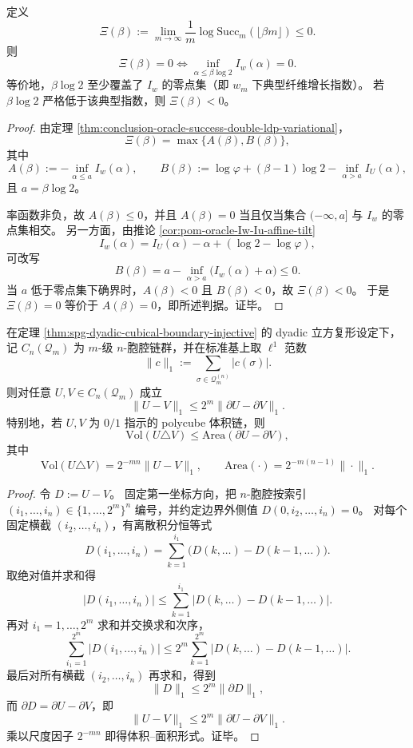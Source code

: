 \begin{corollary}[可逆容量曲线的强逆判据]\label{cor:conclusion-oracle-success-strong-converse}
定义
\[
\Xi(\beta):=\lim_{m\to\infty}\frac1m\log \mathrm{Succ}_m(\lfloor \beta m\rfloor)\le 0.
\]
则
\[
\Xi(\beta)=0
\iff
\inf_{\alpha\le \beta\log 2}I_w(\alpha)=0.
\]
等价地，\(\beta\log 2\) 至少覆盖了 \(I_w\) 的零点集（即 \(w_m\) 下典型纤维增长指数）。
若 \(\beta\log 2\) 严格低于该典型指数，则 \(\Xi(\beta)<0\)。
\end{corollary}

\begin{proof}
由定理 \ref{thm:conclusion-oracle-success-double-ldp-variational}，
\[
\Xi(\beta)=\max\{A(\beta),B(\beta)\},
\]
其中
\[
A(\beta):=-\inf_{\alpha\le a}I_w(\alpha),\qquad
B(\beta):=\log\varphi+(\beta-1)\log2-\inf_{\alpha>a}I_U(\alpha),
\]
且 \(a=\beta\log2\)。

率函数非负，故 \(A(\beta)\le 0\)，并且 \(A(\beta)=0\) 当且仅当集合 \((-\infty,a]\) 与 \(I_w\) 的零点集相交。
另一方面，由推论 \ref{cor:pom-oracle-Iw-Iu-affine-tilt}
\[
I_w(\alpha)=I_U(\alpha)-\alpha+(\log2-\log\varphi),
\]
可改写
\[
B(\beta)=a-\inf_{\alpha>a}\bigl(I_w(\alpha)+\alpha\bigr)\le 0.
\]
当 \(a\) 低于零点集下确界时，\(A(\beta)<0\) 且 \(B(\beta)<0\)，故 \(\Xi(\beta)<0\)。
于是 \(\Xi(\beta)=0\) 等价于 \(A(\beta)=0\)，即所述判据。证毕。
\end{proof}

\begin{theorem}\label{thm:conclusion-strong-holography-lipschitz-stability}
在定理 \ref{thm:spg-dyadic-cubical-boundary-injective} 的 dyadic 立方复形设定下，记 \(C_n(\mathcal Q_m)\) 为 \(m\)-级 \(n\)-胞腔链群，并在标准基上取 \(\ell^1\) 范数
\[
\|c\|_1:=\sum_{\sigma\in\mathcal Q_m^{(n)}}|c(\sigma)|.
\]
则对任意 \(U,V\in C_n(\mathcal Q_m)\) 成立
\[
\|U-V\|_1\le 2^m\|\partial U-\partial V\|_1.
\]
特别地，若 \(U,V\) 为 \(0/1\) 指示的 polycube 体积链，则
\[
\mathrm{Vol}(U\triangle V)\le \mathrm{Area}(\partial U-\partial V),
\]
其中
\[
\mathrm{Vol}(U\triangle V)=2^{-mn}\|U-V\|_1,\qquad
\mathrm{Area}(\cdot)=2^{-m(n-1)}\|\cdot\|_1.
\]
\end{theorem}

\begin{proof}
令 \(D:=U-V\)。
固定第一坐标方向，把 \(n\)-胞腔按索引
\(
(i_1,\dots,i_n)\in\{1,\dots,2^m\}^n
\)
编号，并约定边界外侧值 \(D(0,i_2,\dots,i_n)=0\)。
对每个固定横截 \((i_2,\dots,i_n)\)，有离散积分恒等式
\[
D(i_1,\dots,i_n)
=\sum_{k=1}^{i_1}\bigl(D(k,\dots)-D(k-1,\dots)\bigr).
\]
取绝对值并求和得
\[
|D(i_1,\dots,i_n)|
\le
\sum_{k=1}^{i_1}\bigl|D(k,\dots)-D(k-1,\dots)\bigr|.
\]
再对 \(i_1=1,\dots,2^m\) 求和并交换求和次序，
\[
\sum_{i_1=1}^{2^m}|D(i_1,\dots,i_n)|
\le
2^m\sum_{k=1}^{2^m}|D(k,\dots)-D(k-1,\dots)|.
\]
最后对所有横截 \((i_2,\dots,i_n)\) 再求和，得到
\[
\|D\|_1\le 2^m\|\partial D\|_1,
\]
而 \(\partial D=\partial U-\partial V\)，即
\[
\|U-V\|_1\le 2^m\|\partial U-\partial V\|_1.
\]
乘以尺度因子 \(2^{-mn}\) 即得体积--面积形式。证毕。
\end{proof}

